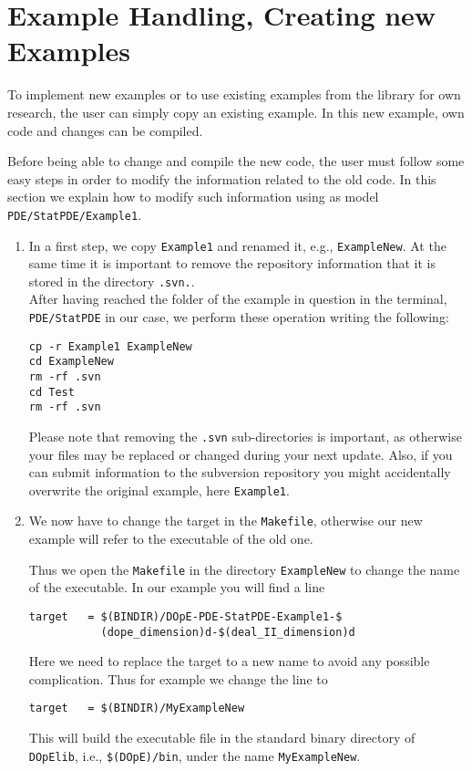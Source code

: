 \chapter{Example Handling, Creating new Examples}
\label{chap:howtoex}
To implement new examples or to use existing examples 
from the library for own research, the user 
can simply copy an existing example. In this 
new example, own code and changes can be compiled.

Before being able to change and compile the new code, the user must 
follow some easy steps in order to modify the information related to the old code. In 
this section we explain how to modify such information using as model 
\texttt{PDE/StatPDE/Example1}.

\begin{enumerate}
 \item In a first step, we copy \texttt{Example1} and renamed it, e.g., 
\texttt{ExampleNew}. At the same time it is important to remove the repository 
information that it is stored in the directory \texttt{.svn.}. \\
After having reached the folder of the example in question in the terminal, 
\texttt{PDE/StatPDE} in our case, we perform these operation writing the following:
\begin{verbatim}
cp -r Example1 ExampleNew
cd ExampleNew
rm -rf .svn
cd Test
rm -rf .svn
\end{verbatim}
Please note that removing the \texttt{.svn} sub-directories is important,
as otherwise your files may be replaced or changed during your next
update. Also, if you can submit information to the subversion repository 
you might accidentally overwrite the original example, here \texttt{Example1}.

\item We now have to change the target in the \texttt{Makefile}, 
  otherwise our new example will refer to the executable of the old one.
  
  Thus we open the \texttt{Makefile} in the directory \texttt{ExampleNew}
  to change the name of the executable. In our example you will find a line
\begin{verbatim}
target   = $(BINDIR)/DOpE-PDE-StatPDE-Example1-$
           (dope_dimension)d-$(deal_II_dimension)d
\end{verbatim}
Here we need to replace the target to a new name to avoid any 
possible complication. Thus for example we change the line to 
\begin{verbatim}
target   = $(BINDIR)/MyExampleNew
\end{verbatim}
This will build the executable file in the standard binary directory 
of \texttt{DOpElib}, i.e., \texttt{\$(DOpE)/bin}, under the name 
\texttt{MyExampleNew}.


\end{enumerate}
